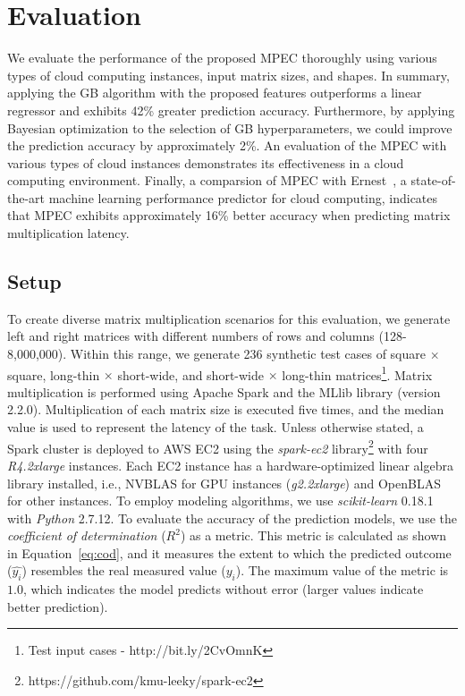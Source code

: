 \documentclass[10pt, conference, compsocconf]{IEEEtran}
\begin{document}
\section{Evaluation}{\label{sec:eval}}
We evaluate the performance of the proposed MPEC thoroughly using various types of cloud computing instances, input matrix sizes, and shapes. In summary, applying the GB algorithm with the proposed features outperforms a linear regressor and exhibits  42\% greater prediction accuracy. Furthermore, by applying Bayesian optimization to the selection of GB hyperparameters, we could improve the prediction accuracy by approximately 2\%. An evaluation of the MPEC with various types of cloud instances demonstrates its effectiveness in a cloud computing environment. Finally, a comparsion of MPEC with Ernest~\cite{ernest}, a state-of-the-art machine learning performance predictor for cloud computing, indicates that MPEC exhibits approximately 16\% better accuracy when predicting matrix multiplication latency.

\subsection{Setup}
To create diverse matrix multiplication scenarios for this evaluation, we generate left and right matrices with different numbers of rows and columns (128-8,000,000). Within this range, we generate 236 synthetic test cases of square $\times$ square, long-thin $\times$ short-wide, and short-wide $\times$ long-thin matrices\footnote{Test input cases - http://bit.ly/2CvOmnK}. Matrix multiplication is performed using Apache Spark and the MLlib library (version 2.2.0). Multiplication of each matrix size is executed five times, and the median value is used to represent the latency of the task. Unless otherwise stated, a Spark cluster is deployed to AWS EC2 using the \textit{spark-ec2} library\footnote{https://github.com/kmu-leeky/spark-ec2} with four \textit{R4.2xlarge} instances. Each EC2 instance has a hardware-optimized linear algebra library installed, i.e., NVBLAS for GPU instances (\textit{g2.2xlarge}) and OpenBLAS for other instances. To employ modeling algorithms, we use \textit{scikit-learn} 0.18.1 with \textit{Python} 2.7.12. To evaluate the accuracy of the prediction models, we use the \textit{coefficient of determination} ($R^2$) as a metric. This metric is calculated as shown in Equation~\ref{eq:cod}, and it measures the extent to which the predicted outcome ($\hat{y_i}$) resembles the real measured value ($y_i$). The maximum value of the metric is $1.0$, which indicates the model predicts without error (larger values indicate better prediction).
\end{document}
